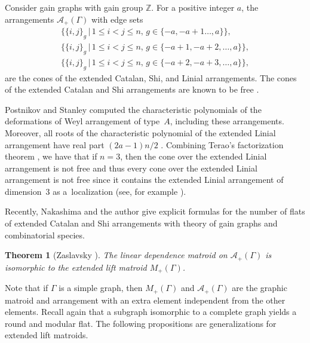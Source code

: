 \documentclass[pdftex]{sigma}
\numberwithin{equation}{section}
\newtheorem{Theorem}{Theorem}[section]
\begin{document}
\begin{Remark}
Consider gain graphs with gain group $ \mathbb{Z} $.
For a positive integer $ a $, the arrangements $ \mathcal{A}_{+}(\Gamma) $ with edge sets
\begin{gather*}
 \{\{i,j\}_{g} \,|\, 1 \leq i < j \leq n, \, g \in \{-a,-a+1 \dots, a\}\}, \\
 \{\{i,j\}_{g} \,|\, 1 \leq i < j \leq n, \, g \in \{-a+1, -a+2, \dots, a\}\}, \\
 \{\{i,j\}_{g} \,|\, 1 \leq i < j \leq n, \, g \in \{-a+2,-a+3, \dots, a\}\},
\end{gather*}
are the cones of the extended Catalan, Shi, and Linial arrangements.
The cones of the extended Catalan and Shi arrangements are known to be free \cite{athanasiadis1998free-ejoc,edelman1996free-dcg, yoshinaga2004characterization-im}.

Postnikov and Stanley \cite{postnikov2000deformations-joctsa} computed the characteristic polynomials of the deformations of Weyl arrangement of type~$ A $, including these arrangements.
Moreover, all roots of the characteristic polynomial of the extended Linial arrangement have real part $ (2a-1)n/2 $ \cite[Theorem~9.12]{postnikov2000deformations-joctsa}.
Combining Terao's factorization theorem \cite{terao1981generalized-im}, we have that if $ n = 3 $, then the cone over the extended Linial arrangement is not free and thus every cone over the extended Linial arrangement is not free since it contains the extended Linial arrangement of dimension~$ 3 $ as a~localization (see, for example \cite[Theorem~4.37]{orlik1992arrangements}).

Recently, Nakashima and the author \cite{nakashima2019enumeration-a} give explicit formulas for the number of flats of extended Catalan and Shi arrangements with theory of gain graphs and combinatorial species.
\end{Remark}

\begin{Theorem}[{Zaslavsky \cite[Theorem 3.1(a)]{zaslavsky2003biased-joctsb}}]\label{Zaslavsky extended lift arrangement}
The linear dependence matroid on $ \mathcal{A}_{+}(\Gamma) $ is isomorphic to the extended lift matroid $ M_{+}(\Gamma) $.
\end{Theorem}

Note that if $ \Gamma $ is a simple graph, then $ M_{+}(\Gamma) $ and $ \mathcal{A}_{+}(\Gamma) $ are the graphic matroid and arrangement with an extra element independent from the other elements.
Recall again that a subgraph isomorphic to a complete graph yields a round and modular flat.
The following propositions are generalizations for extended lift matroids.
\end{document}
